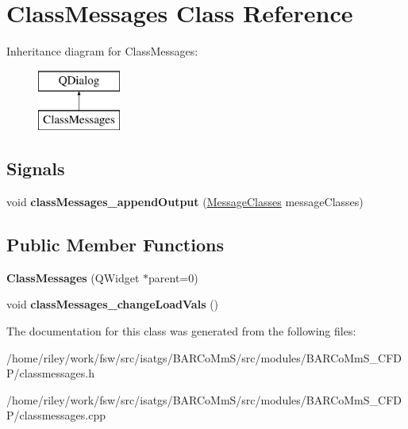 \hypertarget{class_class_messages}{}\section{Class\+Messages Class Reference}
\label{class_class_messages}
Inheritance diagram for Class\+Messages\+:\begin{figure}[H]
\begin{center}
\leavevmode
\includegraphics[height=2.000000cm]{class_class_messages}
\end{center}
\end{figure}
\subsection*{Signals}
\begin{DoxyCompactItemize}
\item 
void {\bfseries class\+Messages\+\_\+append\+Output} (\hyperlink{struct_message_classes}{Message\+Classes} message\+Classes)\hypertarget{class_class_messages_a0036b5812d6421f55ae892756219a680}{}\label{class_class_messages_a0036b5812d6421f55ae892756219a680}

\end{DoxyCompactItemize}
\subsection*{Public Member Functions}
\begin{DoxyCompactItemize}
\item 
{\bfseries Class\+Messages} (Q\+Widget $\ast$parent=0)\hypertarget{class_class_messages_a6eba787ba900af09b5a235826b6a748f}{}\label{class_class_messages_a6eba787ba900af09b5a235826b6a748f}

\item 
void {\bfseries class\+Messages\+\_\+change\+Load\+Vals} ()\hypertarget{class_class_messages_abde2b3837e9f0c1272008b2278746c7f}{}\label{class_class_messages_abde2b3837e9f0c1272008b2278746c7f}

\end{DoxyCompactItemize}


The documentation for this class was generated from the following files\+:\begin{DoxyCompactItemize}
\item 
/home/riley/work/fsw/src/isatgs/\+B\+A\+R\+Co\+Mm\+S/src/modules/\+B\+A\+R\+Co\+Mm\+S\+\_\+\+C\+F\+D\+P/classmessages.\+h\item 
/home/riley/work/fsw/src/isatgs/\+B\+A\+R\+Co\+Mm\+S/src/modules/\+B\+A\+R\+Co\+Mm\+S\+\_\+\+C\+F\+D\+P/classmessages.\+cpp\end{DoxyCompactItemize}
